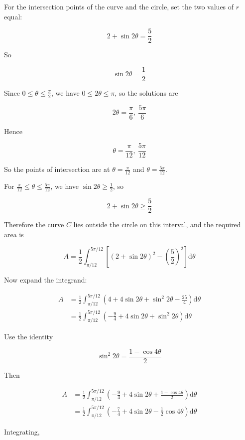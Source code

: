 \documentclass[leqno]{article}
\begin{document}
\begin{enumerate}[
	  label=\textbf{\arabic*.},
	  leftmargin=*,
	  topsep=0pt,
	  partopsep=0pt,
	  parsep=0pt
	]
	\begin{tcolorbox}[colback=white, colframe=scarlet, title={\textbf{Solution}}, breakable, grow to left by=6mm, grow to right by=10mm]
	For the intersection points of the curve and the circle, set the two values of $r$ equal:
	
	\[
	2+\sin 2\theta=\frac52
	\]
	
	So
	
	\[
	\sin 2\theta=\frac12
	\]
	
	Since $0\le \theta \le \frac{\pi}{2}$, we have $0\le 2\theta \le \pi$, so the solutions are
	
	\[
	2\theta=\frac{\pi}{6},\ \frac{5\pi}{6}
	\]
	
	Hence
	
	\[
	\theta=\frac{\pi}{12},\ \frac{5\pi}{12}
	\]
	
	So the points of intersection are at $\theta=\frac{\pi}{12}$ and $\theta=\frac{5\pi}{12}$.
	
	For $\frac{\pi}{12}\le \theta \le \frac{5\pi}{12}$, we have $\sin 2\theta \ge \frac12$, so
	
	\[
	2+\sin 2\theta \ge \frac52
	\]
	
	Therefore the curve $C$ lies outside the circle on this interval, and the required area is
	
	\[
	A=\frac12\int_{\pi/12}^{5\pi/12}\left[\left(2+\sin 2\theta\right)^2-\left(\frac52\right)^2\right]\mathrm{d}\theta
	\]
	
	Now expand the integrand:
	
	\begin{align*}
	A&=\frac12\int_{\pi/12}^{5\pi/12}\left(4+4\sin 2\theta+\sin^2 2\theta-\frac{25}{4}\right)\mathrm{d}\theta\\
	&=\frac12\int_{\pi/12}^{5\pi/12}\left(-\frac94+4\sin 2\theta+\sin^2 2\theta\right)\mathrm{d}\theta
	\end{align*}
	
	Use the identity
	
	\[
	\sin^2 2\theta=\frac{1-\cos 4\theta}{2}
	\]
	
	Then
	
	\begin{align*}
	A&=\frac12\int_{\pi/12}^{5\pi/12}\left(-\frac94+4\sin 2\theta+\frac{1-\cos 4\theta}{2}\right)\mathrm{d}\theta\\
	&=\frac12\int_{\pi/12}^{5\pi/12}\left(-\frac74+4\sin 2\theta-\frac12\cos 4\theta\right)\mathrm{d}\theta
	\end{align*}
	
	Integrating,
	

\end{tcolorbox}
\end{enumerate}
\end{document}
